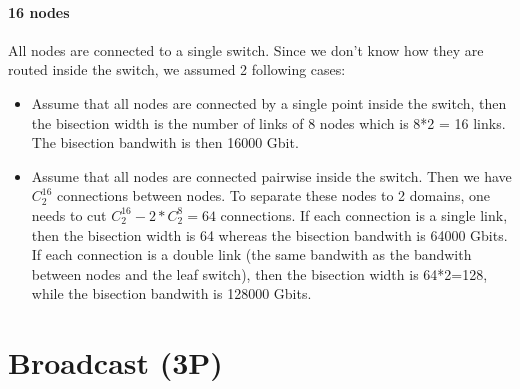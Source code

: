 \documentclass[article]{scrartcl}
\begin{document}
\paragraph{16 nodes} All nodes are connected to a single switch. Since we don't know how they are routed inside the switch, we assumed 2 following cases:
\begin{itemize}
  \item Assume that all nodes are connected by a single point inside the switch, then the bisection width is the number of links of 8 nodes which is 8*2 = 16 links. The bisection bandwith is then 16000 Gbit.
  \item Assume that all nodes are connected pairwise inside the switch. Then we have $C^{16}_{2}$ connections between nodes. To separate these nodes to 2 domains, one needs to cut $C^{16}_{2} - 2*C^{8}_{2} = 64 $ connections. If each connection is a single link, then the bisection width is 64 whereas the bisection bandwith is 64000 Gbits. If each connection is a double link (the same bandwith as the bandwith between nodes and the leaf switch), then the bisection width is 64*2=128, while the bisection bandwith is 128000 Gbits.
\end{itemize}
\section{Broadcast (3P)}
\end{document}
